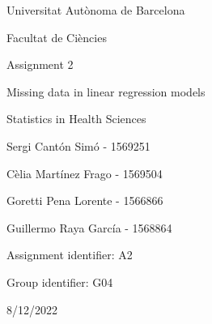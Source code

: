 \documentclass[10pt,a4paper,twoside]{article}\usepackage[]{graphicx}\usepackage[]{xcolor}
\begin{document}
\begin{titlepage}
  \begin{center}
  \LARGE
  {Universitat Aut\`{o}noma de Barcelona \par}
  
  \vspace{1cm}
  
  \Large
  \scshape{Facultat de Ci\`{e}ncies \par}
  
  \vspace{3cm}
  
  \Huge
  \bfseries{{Assignment 2 \par}}
  
  \vspace{1cm}
  
  \Huge
  \scshape{Missing data in linear regression models \par}
  \vfill
  
  \vspace{2cm}
  
  \Large
  \scshape{Statistics in Health Sciences \par}
  \vfill
  
  \vspace{2cm}
  

  \Large
  {Sergi Cant\'{o}n Sim\'{o} - 1569251 \par}
  \Large
  {C\`{e}lia Mart\'{i}nez Frago - 1569504 \par}
  \Large 
  {Goretti Pena Lorente - 1566866 \par}
  \Large 
  {Guillermo Raya Garc\'{i}a - 1568864 \par}
  
  \Large 
  {Assignment identifier: A2 \par}
  
  \Large 
  {Group identifier: G04 \par}
  
  \vspace{1cm}
  \Large
  {8/12/2022 \par}
  
  \vfill
  \date{}
  
  \end{center}
\end{titlepage}

\end{document}
